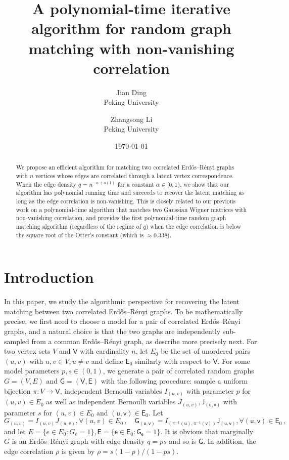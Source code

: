 \documentclass[11pt]{article}
\title{A polynomial-time iterative algorithm for random graph matching with non-vanishing correlation}
\author{Jian Ding \\ Peking University  \and  Zhangsong Li \\ Peking University}
\date{\today}
\def\G{\mathsf G}
\numberwithin{equation}{section}
\begin{document}
\maketitle

\begin{abstract}
We propose an efficient algorithm for matching two correlated Erd\H{o}s--R\'enyi graphs with $n$ vertices whose edges are correlated through a latent vertex correspondence. When the edge density $q= n^{- \alpha+o(1)}$ for a constant $\alpha \in [0,1)$, we show that our algorithm has polynomial running time and succeeds to recover the latent matching as long as the edge correlation is non-vanishing. This is closely related to our previous work on a polynomial-time algorithm that matches two Gaussian Wigner matrices with non-vanishing correlation, and provides the first polynomial-time random graph matching algorithm (regardless of the regime of $q$) when the edge correlation is below the square root of the Otter's constant  (which is $\approx 0.338$).
\end{abstract}


\section{Introduction}

In this paper, we study the algorithmic perspective for recovering the latent matching between two correlated Erd\H{o}s--R\'enyi graphs. To be mathematically precise, we first need to choose a model for a pair of correlated Erd\H{o}s--R\'enyi graphs, and a natural choice is that the two graphs are independently sub-sampled from a common Erd\H{o}s--R\'enyi graph, as describe more precisely next. For two vertex sets $V$ and $\mathsf V$ with cardinality $n$, let $E_0$ be the set of unordered pairs $(u,v)$ with $u,v\in V, u\neq v$ and define $\mathsf E_0$ similarly with respect to $\mathsf V$. For some model parameters $p,s\in (0,1)$, we generate a pair of correlated random graphs $G=(V,E)$ and $\mathsf G=(\mathsf V,\mathsf E)$ with the following procedure: sample a uniform bijection $\pi:V\to \mathsf V$, independent Bernoulli variables $I_{(u,v)}$ with parameter $p$ for $(u,v)\in E_0$ as well as independent Bernoulli variables $J_{(u, v)}, \mathsf J_{(\mathsf u,\mathsf v)}$ with parameter $s$ for $(u, v)\in E_0$ and $(\mathsf u,\mathsf v)\in \mathsf E_0$. Let 
\begin{equation}
	\label{eq:def-of-G_e}
	G_{(u,v)}=I_{(u,v)}J_{(u,v)},\forall (u,v)\in E_0\,,\quad \G_{(\mathsf u,\mathsf v)}=I_{\left(\pi^{-1}(\mathsf u),\pi^{-1}(\mathsf v)\right)}\mathsf J_{(\mathsf u,\mathsf v)},\forall (\mathsf u,\mathsf v)\in \mathsf E_0\,,
\end{equation}
and let $E=\{e\in E_0: G_e=1\}, \mathsf E=\{\mathsf e\in \mathsf E_0:\G_{\mathsf e}=1\}$. It is obvious that marginally $G$ is an Erd\H{o}s--R\'enyi graph with edge density $q = ps$  and so is $\mathsf G$. In addition, the edge correlation $\rho$ is given by $\rho = s(1-p)/(1-ps)$.
\end{document}
